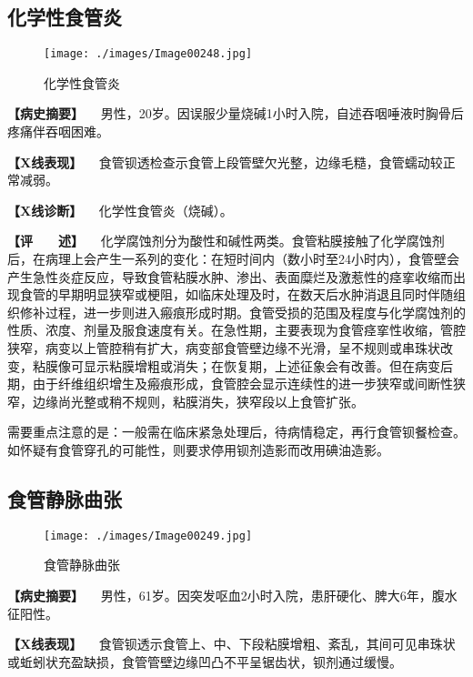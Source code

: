 \subsection{化学性食管炎}

\begin{figure}[!htbp]
 \centering
 \texttt{[image: ./images/Image00248.jpg]}
 \captionsetup{justification=centering}
 \caption{化学性食管炎}
 \label{fig5-2-5}
  \end{figure} 

\textbf{【病史摘要】}
　男性，20岁。因误服少量烧碱1小时入院，自述吞咽唾液时胸骨后疼痛伴吞咽困难。

\textbf{【X线表现】}
　食管钡透检查示食管上段管壁欠光整，边缘毛糙，食管蠕动较正常减弱。

\textbf{【X线诊断】} 　化学性食管炎（烧碱）。

\textbf{【评　　述】}
　化学腐蚀剂分为酸性和碱性两类。食管粘膜接触了化学腐蚀剂后，在病理上会产生一系列的变化：在短时间内（数小时至24小时内），食管壁会产生急性炎症反应，导致食管粘膜水肿、渗出、表面糜烂及激惹性的痉挛收缩而出现食管的早期明显狭窄或梗阻，如临床处理及时，在数天后水肿消退且同时伴随组织修补过程，进一步则进入瘢痕形成时期。食管受损的范围及程度与化学腐蚀剂的性质、浓度、剂量及服食速度有关。在急性期，主要表现为食管痉挛性收缩，管腔狭窄，病变以上管腔稍有扩大，病变部食管壁边缘不光滑，呈不规则或串珠状改变，粘膜像可显示粘膜增粗或消失；在恢复期，上述征象会有改善。但在病变后期，由于纤维组织增生及瘢痕形成，食管腔会显示连续性的进一步狭窄或间断性狭窄，边缘尚光整或稍不规则，粘膜消失，狭窄段以上食管扩张。

需要重点注意的是：一般需在临床紧急处理后，待病情稳定，再行食管钡餐检查。如怀疑有食管穿孔的可能性，则要求停用钡剂造影而改用碘油造影。

\subsection{食管静脉曲张}

\begin{figure}[!htbp]
 \centering
 \texttt{[image: ./images/Image00249.jpg]}
 \captionsetup{justification=centering}
 \caption{食管静脉曲张}
 \label{fig5-2-6}
  \end{figure} 

\textbf{【病史摘要】}
　男性，61岁。因突发呕血2小时入院，患肝硬化、脾大6年，腹水征阳性。

\textbf{【X线表现】}
　食管钡透示食管上、中、下段粘膜增粗、紊乱，其间可见串珠状或蚯蚓状充盈缺损，食管管壁边缘凹凸不平呈锯齿状，钡剂通过缓慢。

